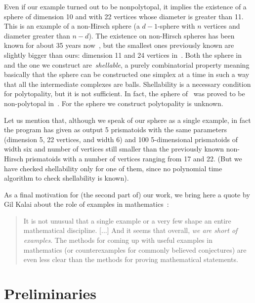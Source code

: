 \documentclass[12pt,a4paper]{article}
\theoremstyle{plain}
\theoremstyle{definition}
\begin{document}
Even if our example turned out to be nonpolytopal, it implies the existence of a sphere of dimension 10 and with 22 vertices whose diameter is greater than 11. This is an example of a non-Hirsch sphere (a $d-1$-sphere with $n$ vertices and diameter greater than $n-d$).
The existence on non-Hirsch spheres has been known for about 35 years now~\cite{ManiWalkup}, but the smallest ones previously known are slightly bigger than ours: dimension 11 and 24 vertices in~\cite{ManiWalkup}. Both the sphere in~\cite{ManiWalkup} and the one we construct are~\emph{shellable}, a purely combinatorial property meaning basically that the sphere can be constructed one simplex at a time in such a way that all the intermediate complexes are balls. Shellability is a necessary condition for polytopality, but it is not sufficient. In fact, the sphere of~\cite{ManiWalkup} was proved to be non-polytopal in~\cite{nonPolytopal}. For the sphere we construct polytopality is unknown.

Let us mention that, although we speak of our sphere as a single example, in fact the program has given as output 5 prismatoids with the same parameters (dimension 5, 22 vertices, and width 6) and 100  5-dimensional prismatoids of width six and  number of vertices still smaller than the previously known non-Hirsch prismatoids with a number of vertices ranging from 17 and 22. (But we have checked shellability only for one of them, since no polynomial time algorithm to check shellability is known).

As a final motivation for (the second part of) our work, we bring here a quote by Gil Kalai about the role of examples in mathematics~\cite{examples}:

\begin{quote}
It is not unusual that a single example or a very few shape an entire mathematical discipline. [...] And it seems that overall, \emph{we are short of examples}. The methods for coming up with useful examples in mathematics (or counterexamples for commonly believed conjectures) are even less clear than the methods for proving mathematical statements.
\end{quote}

\section{Preliminaries}
\end{document}
